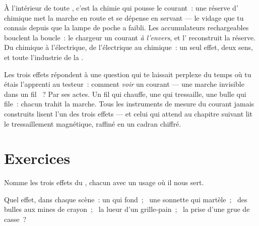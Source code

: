 \begin{example}\label{ex:g8:electric-current-effects:battery}
À l'intérieur de toute , c'est la chimie qui pousse le courant~:
une réserve d' chimique met la marche en route et se dépense
en servant --- le vidage que tu connais depuis que la lampe de poche
a faibli. Les accumulateurs rechargeables bouclent la boucle~: le
chargeur  un courant \emph{à l'envers}, et l'
reconstruit la réserve. Du chimique à l'électrique, de l'électrique
au chimique~: un seul effet, deux sens, et toute l'industrie de la
.
\end{example}

\begin{remark}\label{rem:g8:electric-current-effects:detect}
Les trois effets répondent à une question qui te laissait perplexe du
temps où tu étais l'apprenti au testeur~: comment \emph{voir} un
courant --- une marche invisible dans un fil ~? Par ses actes.
Un fil qui chauffe, une  qui tressaille, une bulle qui
file~: chacun trahit la marche. Tous les instruments de mesure du
courant jamais construits lisent l'un des trois effets --- et celui
qui attend au chapitre suivant lit le tressaillement magnétique,
raffiné en un cadran chiffré.
\end{remark}

\section{Exercices}

\begin{exercise}[$\star$]\label{exo:g8:electric-current-effects:1}
Nomme les trois effets du , chacun avec un usage où
il nous sert.
\end{exercise}

\begin{exercise}[$\star$]\label{exo:g8:electric-current-effects:2}
Quel effet, dans chaque scène~: un  qui fond~; \ une sonnette
qui martèle~; \ des bulles aux mines de crayon~; \ la lueur d'un
grille-pain~; \ la prise d'une grue de casse~?
\end{exercise}

